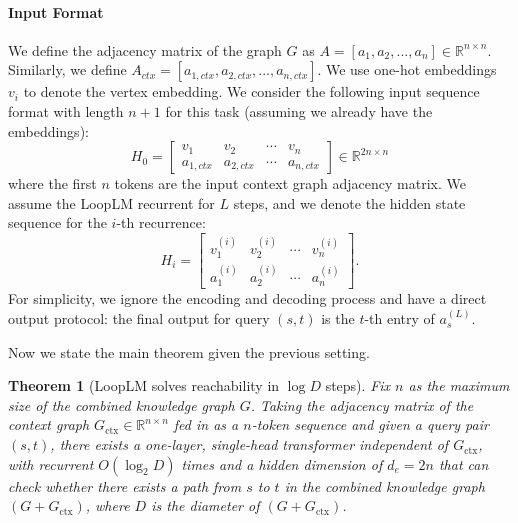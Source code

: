 \documentclass[]{bytedance_seed}
\newcommand{\R}{\mathbb{R}}
\newcommand{\1}{\mathbf{1}}
\newtheorem{theorem}{Theorem}
\newcommand{\ut}{LoopLM}
\begin{document}
{\paragraph{Input Format} We define the adjacency matrix of the graph $G$ as $A=[a_1,a_2,...,a_n]\in\R^{n\times n}$. Similarly, we define $A_{ctx}=[a_{1,ctx},a_{2,ctx},...,a_{n,ctx}]$. We use one-hot embeddings $v_i$ to denote the vertex embedding. We consider the following input sequence format with length $n+1$ for this task (assuming we already have the embeddings): 
$$H_0=\begin{bmatrix}
    v_1 &v_2&\cdots&v_n\\
    a_{1,ctx}&a_{2,ctx}&\cdots&a_{n,ctx}\end{bmatrix}\in \R^{2n\times n}$$
where the first $n$ tokens are the input context graph adjacency matrix. 
We assume the \ut{} recurrent for $L$ steps, and we denote the hidden state sequence for the $i$-th recurrence:
$$H_i=\begin{bmatrix}
    v_1^{(i)} &v_2^{(i)}&\cdots&v_n^{(i)}\\
    a_{1}^{(i)}&a_{2}^{(i)}&\cdots&a_{n}^{(i)}\end{bmatrix}.$$
For simplicity, we ignore the encoding and decoding process and have a direct output protocol: the final output for query $(s,t)$ is the $t$-th entry of $a_{s}^{(L)}$. 

Now we state the main theorem given the previous setting.
\begin{theorem}[\ut{} solves reachability in $\log D$ steps]
    \label{appendix_thm:ut_graph_connectivity}
    Fix $n$ as the maximum size of the combined knowledge graph $G$. Taking the adjacency matrix of the context graph $G_{\text{ctx}}\in \R^{n\times n}$ fed in as a $n$-token sequence and given a query pair $(s,t)$, there exists a one-layer, single-head transformer independent of $G_{\text{ctx}}$, with recurrent $O(\log_2 D)$ times and a hidden dimension of $d_e=2n$ that can check whether there exists a path from $s$ to $t$ in the combined knowledge graph $(G+G_{\text{ctx}})$, where $D$ is the diameter of $(G+G_{\text{ctx}})$.
\end{theorem}

}
\end{document}
